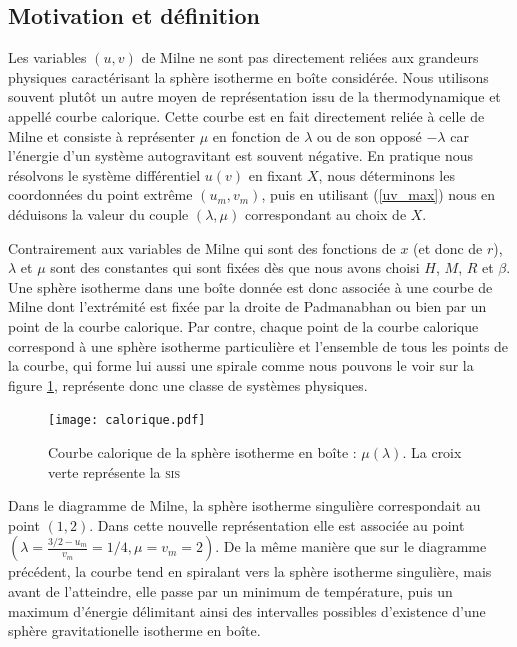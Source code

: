 \subsection{Motivation et définition}
	
	Les variables $(u,v)$ de Milne ne sont pas directement reliées aux grandeurs physiques caractérisant la sphère
	isotherme en boîte considérée. Nous utilisons souvent plutôt un autre moyen de représentation issu de la
	thermodynamique et appellé courbe calorique. Cette courbe est en fait directement reliée à celle de Milne et
	consiste à représenter $\mu$ en fonction de $\lambda$ ou de son opposé $-\lambda$ car l'énergie d'un système
	autogravitant est souvent négative. En pratique nous résolvons le système différentiel $u(v)$ en fixant $X$,
	nous déterminons les coordonnées du point extrême $(u_m,v_m)$, puis en utilisant (\ref{uv_max}) nous en déduisons la valeur
	du couple $(\lambda,\mu)$ correspondant au choix de $X$.
	
	Contrairement aux variables de Milne qui sont des fonctions de $x$ (et donc de $r$), $\lambda$ et $\mu$ sont des
	constantes qui sont fixées dès que nous avons choisi $H$, $M$, $R$ et $\beta$. Une sphère isotherme dans une boîte
	donnée est donc associée à une courbe de Milne dont l'extrémité est fixée par la droite de Padmanabhan ou bien
	par un point de la courbe calorique. Par contre, chaque point de la courbe calorique correspond à une sphère isotherme
	particulière et l'ensemble de tous les points de la courbe, qui forme lui aussi une spirale comme nous pouvons le
	voir sur la figure \ref{Ener}, représente donc une classe de systèmes physiques.
	
	\begin{figure}[h!]
		\centering \texttt{[image: calorique.pdf]}
		\caption{Courbe calorique de la sphère isotherme en boîte : $\mu(\lambda)$. La croix verte représente la \textsc{sis}}
		\label{Ener}
	\end{figure}

	Dans le diagramme de Milne, la sphère isotherme singulière correspondait au point $\left(1,2\right)$.
	Dans cette nouvelle représentation elle est associée au point $\left(\lambda = \frac{3/2 - u_m}{v_m} = 1/4, \mu = v_m = 2\right)$.
	De la même manière que sur le diagramme précédent, la courbe tend en spiralant vers la sphère isotherme singulière, mais avant de l'atteindre,
	elle passe par un minimum de température, puis un maximum d'énergie délimitant ainsi des intervalles possibles d'existence d'une sphère gravitationelle isotherme en boîte.

